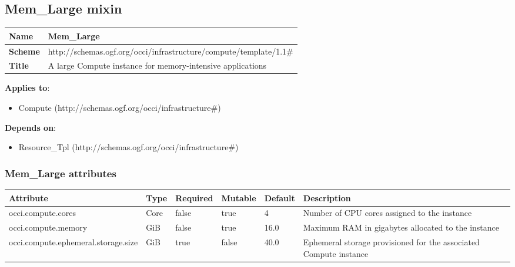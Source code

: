 \documentclass{article}
\begin{document}
\subsection{Mem\_Large mixin}
\begin{center}
\begin{tabular}{|l|l|}
  \hline
  \textbf{Name} & Mem\_Large \\
  \hline  
  \textbf{Scheme} & http://schemas.ogf.org/occi/infrastructure/compute/template/1.1\# \\
  \hline
  \textbf{Title} & A large Compute instance for memory-intensive applications \\
  \hline
\end{tabular}
\end{center}
\textbf{Applies to}:
\begin{itemize}
	\item Compute (http://schemas.ogf.org/occi/infrastructure\#)
\end{itemize}
\textbf{Depends on}:
\begin{itemize}
	\item Resource\_Tpl (http://schemas.ogf.org/occi/infrastructure\#)
\end{itemize}

\subsubsection{Mem\_Large attributes}
\begin{tabularx}{\textwidth}{|l|l|p{1.4cm}|p{1.3cm}|l|X|}
  \hline
  \textbf{Attribute} & \textbf{Type} & \textbf{Required} & \textbf{Mutable} & \textbf{Default} & \textbf{Description} \\
  \hline  
  occi.compute.cores & Core & false & true & 4 & Number of CPU cores assigned to the instance \\
  \hline
  occi.compute.memory & GiB & false & true & 16.0 & Maximum RAM in gigabytes allocated to the instance \\
  \hline
  occi.compute.ephemeral.storage.size & GiB & true & false & 40.0 & Ephemeral storage provisioned for the associated Compute instance \\
  \hline
\end{tabularx}
\end{document}
